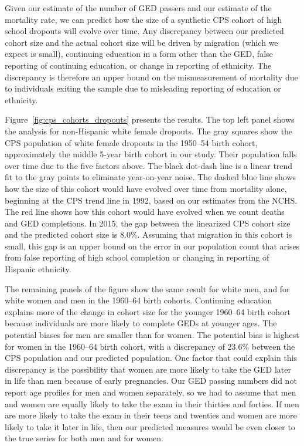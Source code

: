 Given our estimate of the number of GED passers and our estimate of the mortality rate, we can predict how the size of a synthetic CPS cohort of high school dropouts will evolve over time. Any discrepancy between our predicted cohort size and the actual cohort size will be driven by migration (which we expect is small), continuing education in a form other than the GED, false reporting of continuing education, or change in reporting of ethnicity. The discrepancy is therefore an upper bound on the mismeasurement of mortality due to individuals exiting the sample due to misleading reporting of education or ethnicity.

Figure~\ref{fig:cps_cohorts_dropouts} presents the results. The top left panel shows the analysis for non-Hispanic white female dropouts. The gray squares show the CPS population of white female dropouts in the 1950--54 birth cohort, approximately the middle 5-year birth cohort in our study. Their population falls over time due to the five factors above. The black dot-dash line is a linear trend fit to the gray points to eliminate year-on-year noise. The dashed blue line shows how the size of this cohort would have evolved over time from mortality alone, beginning at the CPS trend line in 1992, based on our estimates from the NCHS. The red line shows how this cohort would have evolved when we count deaths and GED completions. In 2015, the gap between the linearized CPS cohort size and the predicted cohort size is 8.0\%. Assuming that migration in this cohort is small, this gap is an upper bound on the error in our population count that arises from false reporting of high school completion or changing in reporting of Hispanic ethnicity.

The remaining panels of the figure show the same result for white men, and for white women and men in the 1960--64 birth cohorts. Continuing education explains more of the change in cohort size for the younger 1960--64 birth cohort because individuals are more likely to complete GEDs at younger ages. The potential biases for men are smaller than for women. The potential bias is highest for women in the 1960--64 birth cohort, with a discrepancy of 23.6\% between the CPS population and our predicted population. One factor that could explain this discrepancy is the possibility that women are more likely to take the GED later in life than men because of early pregnancies. Our GED passing numbers did not report age profiles for men and women separately, so we had to assume that men and women are equally likely to take the exam in their thirties and forties. If men are more likely to take the exam in their teens and twenties and women are more likely to take it later in life, then our predicted measures would be even closer to the true series for both men and for women.

